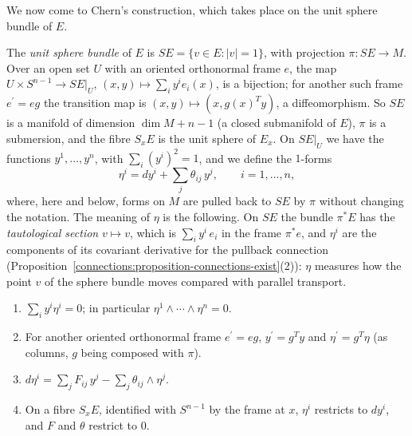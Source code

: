 We now come to Chern's construction, which takes place on the unit sphere bundle of $E$.

The \emph{unit sphere bundle} of $E$ is $SE = \{v \in E : |v| = 1\}$, with projection $\pi \colon SE \to M$. Over an open set $U$ with an oriented orthonormal frame $e$, the map
$U \times S^{n-1} \to SE|_U$, $(x, y) \mapsto \sum_iy^ie_i(x)$, is a bijection; for another such frame $e^{\prime} = eg$ the transition map is $(x, y) \mapsto (x, g(x)^Ty)$, a diffeomorphism. So
$SE$ is a manifold of dimension $\dim M + n - 1$ (a closed submanifold of $E$), $\pi$ is a submersion, and the fibre $S_xE$ is the unit sphere of $E_x$. On $SE|_U$ we have the functions
$y^1, \ldots, y^n$, with $\sum_i(y^i)^2 = 1$, and we define the $1$-forms
\[
\eta^i = dy^i + \sum_j\theta_{ij}\,y^j, \qquad i = 1, \ldots, n,
\]
where, here and below, forms on $M$ are pulled back to $SE$ by $\pi$ without changing the notation. The meaning of $\eta$ is the following. On $SE$ the bundle $\pi^*E$ has the
\emph{tautological section} $v \mapsto v$, which is $\sum_iy^i\,e_i$ in the frame $\pi^*e$, and $\eta^i$ are the components of its covariant derivative for the pullback connection
(Proposition~\ref{connections:proposition-connections-exist}(2)): $\eta$ measures how the point $v$ of the sphere bundle moves compared with parallel transport.

\begin{lemma}\label{characteristic-classes:lemma-tautological}
\begin{enumerate}
\item $\sum_iy^i\eta^i = 0$; in particular $\eta^1 \wedge \cdots \wedge \eta^n = 0$.
\item For another oriented orthonormal frame $e^{\prime} = eg$, $y^{\prime} = g^Ty$ and $\eta^{\prime} = g^T\eta$ (as columns, $g$ being composed with $\pi$).
\item $d\eta^i = \sum_jF_{ij}\,y^j - \sum_j\theta_{ij} \wedge \eta^j$.
\item On a fibre $S_xE$, identified with $S^{n-1}$ by the frame at $x$, $\eta^i$ restricts to $dy^i$, and $F$ and $\theta$ restrict to $0$.
\end{enumerate}
\end{lemma}

